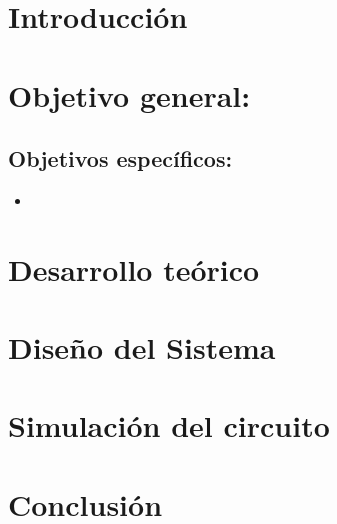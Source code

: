 \documentclass[12pt,letterpaper]{article}
\begin{document}
	\tableofcontents 

	\newpage
	
	\section{Introducción}



    \section{Objetivo general:}
    
    
    \subsection{Objetivos específicos:}
    \begin{itemize}
        \item 
    \end{itemize}

    \section{Desarrollo teórico}


    \section{Diseño del Sistema}



    \newpage


    \section{Simulación del circuito}
    
    \section{Conclusión}
\end{document}
